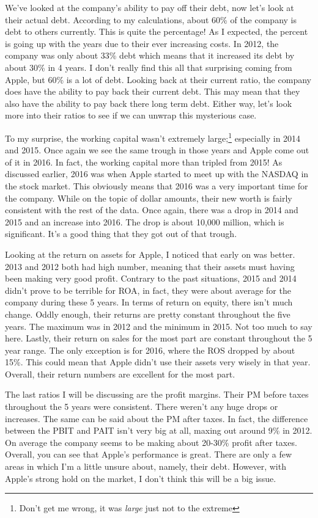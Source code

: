 \documentclass[12pt,a4paper,titlepage]{article}
\begin{document}
We've looked at the company's ability to pay off their debt, now let's look at
their actual debt. According to my calculations, about 60\% of the company is
debt to others currently. This is quite the percentage! As I expected, the
percent is going up with the years due to their ever increasing costs. In 2012,
the company was only about 33\% debt which means that it increased its debt by
about 30\% in 4 years. I don't really find this all that surprising coming from
Apple, but 60\% is a lot of debt. Looking back at their current ratio, the
company does have the ability to pay back their current debt. This may mean that
they also have the ability to pay back there long term debt. Either way, let's
look more into their ratios to see if we can unwrap this mysterious case.

To my surprise, the working capital wasn't extremely large;\footnote{Don't get
  me wrong, it was \emph{large} just not to the extreme} especially in 2014 and
2015. Once again we see the same trough in those years and Apple come out of it
in 2016. In fact, the working capital more than tripled from 2015! As discussed
earlier, 2016 was when Apple started to meet up with the NASDAQ in the stock
market. This obviously means that 2016 was a very important time for the
company. While on the topic of dollar amounts, their new worth is fairly
consistent with the rest of the data. Once again, there was a drop in 2014 and
2015 and an increase into 2016. The drop is about 10,000 million, which is
significant. It's a good thing that they got out of that trough.

Looking at the return on assets for Apple, I noticed that early on was
better. 2013 and 2012 both had high number, meaning that their assets must
having been making very good profit. Contrary to the past situations, 2015 and
2014 didn't prove to be terrible for ROA, in fact, they were about average for
the company during these 5 years. In terms of return on equity, there isn't much
change. Oddly enough, their returns are pretty constant throughout the five
years. The maximum was in 2012 and the minimum in 2015. Not too much to say
here. Lastly, their return on sales for the most part are constant throughout
the 5 year range. The only exception is for 2016, where the ROS dropped by about
15\%. This could mean that Apple didn't use their assets very wisely in that
year. Overall, their return numbers are excellent for the most part.

The last ratios I will be discussing are the profit margins. Their PM before
taxes throughout the 5 years were consistent. There weren't any huge drops or
increases. The same can be said about the PM after taxes. In fact, the
difference between the PBIT and PAIT isn't very big at all, maxing out around
9\% in 2012. On average the company seems to be making about 20-30\% profit
after taxes. Overall, you can see that Apple's performance is great. There are
only a few areas in which I'm a little unsure about, namely, their
debt. However, with Apple's strong hold on the market, I don't think this will
be a big issue.
\end{document}
